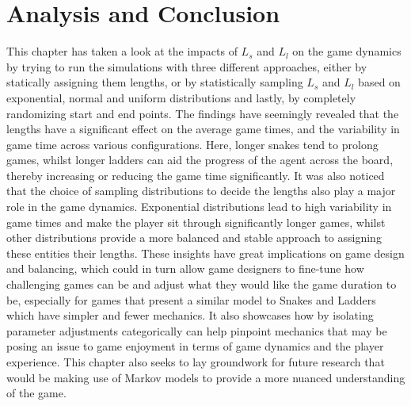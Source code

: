 \documentclass[12pt]{report}
\begin{document}
	\section{Analysis and Conclusion}
	This chapter has taken a look at the impacts of $L_s$ and $L_l$ on the game dynamics by trying to run the simulations with three different approaches, either by statically assigning them lengths, or by statistically sampling $L_s$ and $L_l$ based on exponential, normal and uniform distributions and lastly, by completely randomizing start and end points. The findings have seemingly revealed that the lengths have a significant effect on the average game times, and the variability in game time across various configurations. Here, longer snakes tend to prolong games, whilst longer ladders can aid the progress of the agent across the board, thereby increasing or reducing the game time significantly. It was also noticed that the choice of sampling distributions to decide the lengths also play a major role in the game dynamics. Exponential distributions lead to high variability in game times and  make the player sit through significantly longer games, whilst other distributions provide a more balanced and stable approach to assigning these entities their lengths.
	These insights have great implications on game design and balancing, which could in turn allow game designers to fine-tune how challenging games can be and adjust what they would like the game duration to be, especially for games that present a similar model to Snakes and Ladders which have simpler and fewer mechanics. It also showcases how by isolating parameter adjustments categorically can help pinpoint mechanics that may be posing an issue to game enjoyment in terms of game dynamics and the player experience. This chapter also seeks to lay groundwork for future research that would be making use of Markov models to provide a more nuanced understanding of the game. 
	
	
\end{document}
